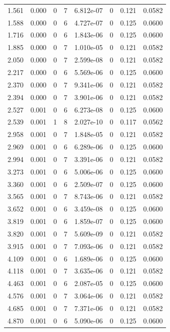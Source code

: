 \documentclass[preview]{standalone}
\begin{document}
{{\begin{tabular}{L{1.2cm}C{1.2cm} C{0.3cm}C{0.5cm} C{1.4cm}C{1.4cm} C{1.4cm}C{1.4cm}}
  1.561  &  0.000  & 0     &  7 &  6.812e-07  & 0  & 0.121 &  0.0582   \\ 
  1.588  &  0.000  & 0     &  6 &  4.727e-07  & 0  & 0.125 &  0.0600   \\ 
  1.716  &  0.000  & 0     &  6 &  1.843e-06  & 0  & 0.125 &  0.0600   \\ 
  1.885  &  0.000  & 0     &  7 &  1.010e-05  & 0  & 0.121 &  0.0582   \\ 
  2.050  &  0.000  & 0     &  7 &  2.599e-08  & 0  & 0.121 &  0.0582   \\ 
  2.217  &  0.000  & 0     &  6 &  5.569e-06  & 0  & 0.125 &  0.0600   \\ 
  2.370  &  0.000  & 0     &  7 &  9.341e-06  & 0  & 0.121 &  0.0582   \\ 
  2.394  &  0.000  & 0     &  7 &  3.901e-06  & 0  & 0.121 &  0.0582   \\ 
  2.527  &  0.001  & 0     &  6 &  6.273e-08  & 0  & 0.125 &  0.0600   \\ 
  2.539  &  0.001  & 1     &  8 &  2.027e-10  & 0  & 0.117 &  0.0562   \\ 
  2.958  &  0.001  & 0     &  7 &  1.848e-05  & 0  & 0.121 &  0.0582   \\ 
  2.969  &  0.001  & 0     &  6 &  6.289e-06  & 0  & 0.125 &  0.0600   \\ 
  2.994  &  0.001  & 0     &  7 &  3.391e-06  & 0  & 0.121 &  0.0582   \\ 
  3.273  &  0.001  & 0     &  6 &  5.006e-06  & 0  & 0.125 &  0.0600   \\ 
  3.360  &  0.001  & 0     &  6 &  2.509e-07  & 0  & 0.125 &  0.0600   \\ 
  3.565  &  0.001  & 0     &  7 &  8.743e-06  & 0  & 0.121 &  0.0582   \\ 
  3.652  &  0.001  & 0     &  6 &  3.459e-08  & 0  & 0.125 &  0.0600   \\ 
  3.819  &  0.001  & 0     &  6 &  1.859e-07  & 0  & 0.125 &  0.0600   \\ 
  3.820  &  0.001  & 0     &  7 &  5.609e-09  & 0  & 0.121 &  0.0582   \\ 
  3.915  &  0.001  & 0     &  7 &  7.093e-06  & 0  & 0.121 &  0.0582   \\ 
  4.109  &  0.001  & 0     &  6 &  1.689e-06  & 0  & 0.125 &  0.0600   \\ 
  4.118  &  0.001  & 0     &  7 &  3.635e-06  & 0  & 0.121 &  0.0582   \\ 
  4.463  &  0.001  & 0     &  6 &  2.087e-05  & 0  & 0.125 &  0.0600   \\ 
  4.576  &  0.001  & 0     &  7 &  3.064e-06  & 0  & 0.121 &  0.0582   \\ 
  4.685  &  0.001  & 0     &  7 &  7.371e-06  & 0  & 0.121 &  0.0582   \\ 
  4.870  &  0.001  & 0     &  6 &  5.090e-06  & 0  & 0.125 &  0.0600   \\ 
\hline 
\end{tabular} 

}}
\end{document}
